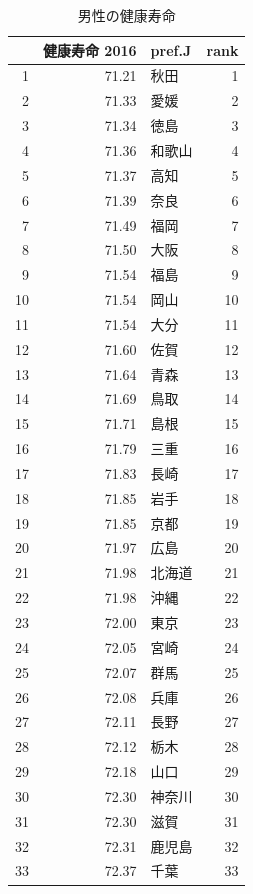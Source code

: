\begin{table}[ht]
\centering
\footnotesize
\caption{男性の健康寿命}
\begin{tabular}{rrlr}
  \hline
 & 健康寿命 2016 & pref.J & rank \\
  \hline
1 & 71.21 & 秋田 &   1 \\
  2 & 71.33 & 愛媛 &   2 \\
  3 & 71.34 & 徳島 &   3 \\
  4 & 71.36 & 和歌山 &   4 \\
  5 & 71.37 & 高知 &   5 \\
  6 & 71.39 & 奈良 &   6 \\
  7 & 71.49 & 福岡 &   7 \\
  8 & 71.50 & 大阪 &   8 \\
  9 & 71.54 & 福島 &   9 \\
  10 & 71.54 & 岡山 &  10 \\
  11 & 71.54 & 大分 &  11 \\
  12 & 71.60 & 佐賀 &  12 \\
  13 & 71.64 & 青森 &  13 \\
  14 & 71.69 & 鳥取 &  14 \\
  15 & 71.71 & 島根 &  15 \\
  16 & 71.79 & 三重 &  16 \\
  17 & 71.83 & 長崎 &  17 \\
  18 & 71.85 & 岩手 &  18 \\
  19 & 71.85 & 京都 &  19 \\
  20 & 71.97 & 広島 &  20 \\
  21 & 71.98 & 北海道 &  21 \\
  22 & 71.98 & 沖縄 &  22 \\
  23 & 72.00 & 東京 &  23 \\
  24 & 72.05 & 宮崎 &  24 \\
  25 & 72.07 & 群馬 &  25 \\
  26 & 72.08 & 兵庫 &  26 \\
  27 & 72.11 & 長野 &  27 \\
  28 & 72.12 & 栃木 &  28 \\
  29 & 72.18 & 山口 &  29 \\
  30 & 72.30 & 神奈川 &  30 \\
  31 & 72.30 & 滋賀 &  31 \\
  32 & 72.31 & 鹿児島 &  32 \\
  33 & 72.37 & 千葉 &  33 \\

\end{tabular}
\end{table}
